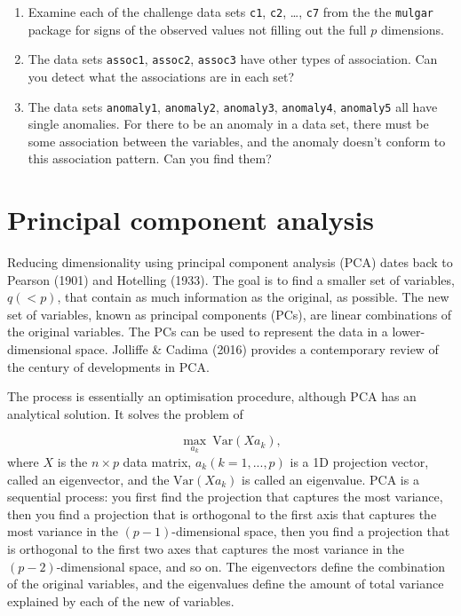 \documentclass[
  letterpaper,
]{krantz}
\begin{document}
\begin{enumerate}
\def\labelenumi{\arabic{enumi}.}
\setcounter{enumi}{3}
\item
  Examine each of the challenge data sets \texttt{c1}, \texttt{c2},
  \ldots, \texttt{c7} from the the \texttt{mulgar} package for signs of
  the observed values not filling out the full \(p\) dimensions.
\item
  The data sets \texttt{assoc1}, \texttt{assoc2}, \texttt{assoc3} have
  other types of association. Can you detect what the associations are
  in each set?
\item
  The data sets \texttt{anomaly1}, \texttt{anomaly2}, \texttt{anomaly3},
  \texttt{anomaly4}, \texttt{anomaly5} all have single anomalies. For
  there to be an anomaly in a data set, there must be some association
  between the variables, and the anomaly doesn't conform to this
  association pattern. Can you find them?
\end{enumerate}


\chapter{Principal component
analysis}\label{principal-component-analysis}


Reducing dimensionality using principal component analysis (PCA) dates
back to Pearson (1901) and Hotelling (1933). The goal is to find a
smaller set of variables, \(q (< p)\), that contain as much information
as the original, as possible. The new set of variables, known as
principal components (PCs), are linear combinations of the original
variables. The PCs can be used to represent the data in a
lower-dimensional space. Jolliffe \& Cadima (2016) provides a
contemporary review of the century of developments in PCA.

The process is essentially an optimisation procedure, although PCA has
an analytical solution. It solves the problem of

\[
\max_{a_k} ~\text{Var} (Xa_k),
\] where \(X\) is the \(n \times p\) data matrix, \(a_k (k=1, ..., p)\)
is a 1D projection vector, called an eigenvector, and the
\(\text{Var} (Xa_k)\) is called an eigenvalue. PCA is a sequential
process: you first find the projection that captures the most variance,
then you find a projection that is orthogonal to the first axis that
captures the most variance in the \((p-1)\)-dimensional space, then you
find a projection that is orthogonal to the first two axes that captures
the most variance in the \((p-2)\)-dimensional space, and so on. The
eigenvectors define the combination of the original variables, and the
eigenvalues define the amount of total variance explained by each of the
new of variables. 
\end{document}
